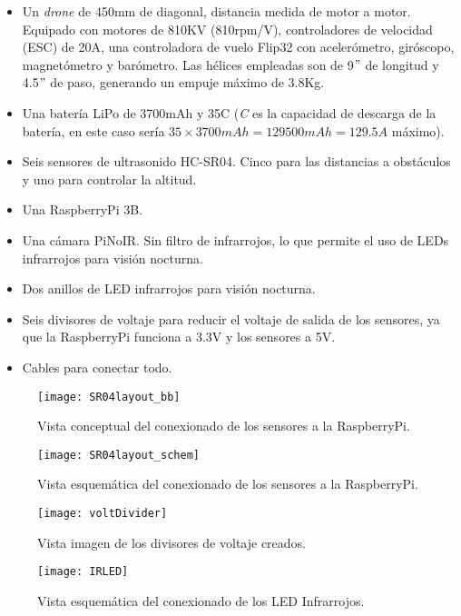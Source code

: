 \begin{itemize}
\item Un \emph{drone} de 450mm de diagonal, distancia medida de motor a motor. Equipado con motores de 810KV (810rpm/V), controladores de velocidad (ESC) de 20A, una controladora de vuelo Flip32 con acelerómetro, giróscopo, magnetómetro y barómetro. Las hélices empleadas son de 9$"$ de longitud y 4.5$"$ de paso, generando un empuje máximo de 3.8Kg.
\item Una batería LiPo de 3700mAh y 35C (\emph{C} es la capacidad de descarga de la batería, en este caso sería $35 \times 3700mAh = 129500mAh = 129.5A$ máximo).
\item Seis sensores de ultrasonido HC-SR04. Cinco para las distancias a obstáculos y uno para controlar la altitud.
\item Una RaspberryPi 3B.
\item Una cámara PiNoIR. Sin filtro de infrarrojos, lo que permite el uso de LEDs infrarrojos para visión nocturna.
\item Dos anillos de LED infrarrojos para visión nocturna.
\item Seis divisores de voltaje para reducir el voltaje de salida de los sensores, ya que la RaspberryPi funciona a 3.3V y los sensores a 5V.
\item Cables para conectar todo.
\end{itemize}

\begin{figure}
	\centering
	\texttt{[image: SR04layout\_bb]}
	\caption[Conceptual de conexión de sensores a RaspberryPi]{Vista conceptual del conexionado de los sensores a la RaspberryPi.}\label{fig:schHCPi}
\end{figure}

\begin{figure}
	\centering
	\texttt{[image: SR04layout\_schem]}
	\caption[Diagrama de conexión de sensores a RaspberryPi]{Vista esquemática del conexionado de los sensores a la RaspberryPi.}\label{fig:concepHCPi}
\end{figure}

\begin{figure}
	\centering
	\texttt{[image: voltDivider]}
	\caption[Divisor de voltaje]{Vista imagen de los divisores de voltaje creados.}\label{fig:imgVoltDiv}
\end{figure}

\begin{figure}
	\centering
	\texttt{[image: IRLED]}
	\caption[LED IR]{Vista esquemática del conexionado de los LED Infrarrojos.}\label{fig:schIRLED}
\end{figure}

